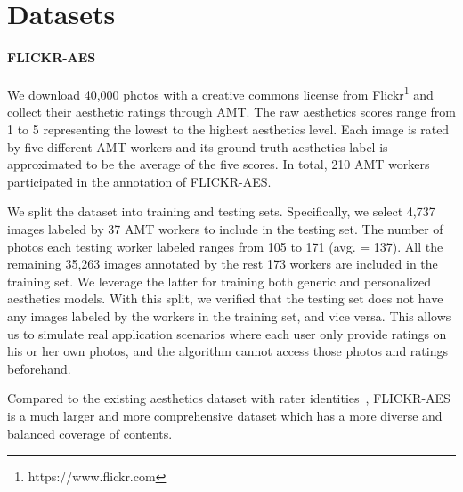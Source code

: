 \section{Datasets}



\paragraph{FLICKR-AES} We download 40,000 photos with a creative commons license from Flickr\footnote{https://www.flickr.com} and collect their aesthetic ratings through AMT. The raw aesthetics scores range from 1 to 5 representing the lowest to the highest aesthetics level. Each image is rated by five different AMT workers and its ground truth aesthetics label is approximated to be the average of the five scores. In total, 210 AMT workers participated in the annotation of FLICKR-AES. 

We split the dataset into training and testing sets. Specifically, we select 4,737 images labeled by 37 AMT workers to include in the testing set. The number of photos each testing worker labeled ranges from 105 to 171 (avg. = 137). All the remaining 35,263 images annotated by the rest 173 workers are included in the training set. We leverage the latter for training both generic and personalized aesthetics models. With this split, we verified that the testing set does not have any images labeled by the workers in the training set, and vice versa. This allows us to simulate real application scenarios where each user only provide ratings on his or her own photos, and the algorithm cannot access those photos and ratings beforehand.

Compared to the existing aesthetics dataset with rater identities~\cite{kong2016photo}, FLICKR-AES is a much larger and more comprehensive dataset which has a more diverse and balanced coverage of contents. 

